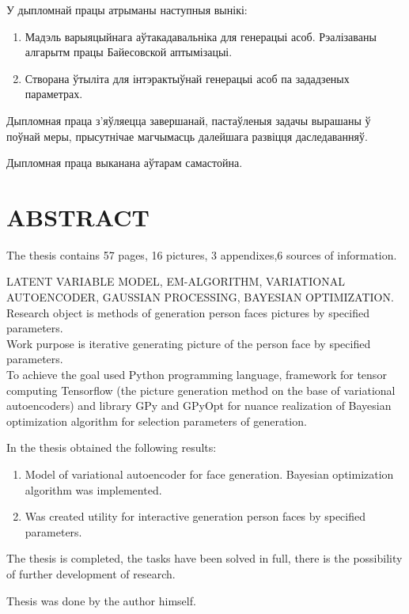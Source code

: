 \indent
У дыпломнай працы атрыманы наступныя вынікі:
\begin{enumerate}
	\setlength{\itemindent}{2em}
	\setlength\itemsep{0.1em}
	\item Мадэль варыяцыйнага аўтакадавальніка для генерацыі асоб. Рэалізаваны алгарытм працы Байесовской аптымізацыі.
	\item Створана ўтыліта для інтэрактыўнай генерацыі асоб па зададзеных параметрах.
\end{enumerate}

Дыпломная праца з'яўляецца завершанай, пастаўленыя задачы вырашаны ў поўнай меры, прысутнічае магчымасць далейшага развіцця даследаванняў.

Дыпломная праца выканана аўтарам самастойна.

\newpage
\chapter*{\large ABSTRACT} 
The thesis contains 57 pages, 16 pictures, 3 appendixes,6 sources of information.

\indent
LATENT VARIABLE MODEL, EM-ALGORITHM, VARIATIONAL \\ AUTOENCODER, GAUSSIAN PROCESSING, BAYESIAN OPTIMIZATION. \\
\indent
Research object is methods of generation person faces pictures by specified parameters. \\
\indent
Work purpose is iterative generating picture of the person face by specified parameters. \\
\indent
To achieve the goal used Python programming language, framework for tensor computing Tensorflow (the picture generation method on the base of variational autoencoders) and library GPy and GPyOpt for nuance realization of Bayesian optimization algorithm for selection parameters of generation.

\indent
In the thesis obtained the following results:
\begin{enumerate}
	\setlength{\itemindent}{2em}
	\setlength\itemsep{0.1em}
	\item Model of variational autoencoder for face generation. Bayesian optimization algorithm was implemented.
	\item Was created utility for interactive  generation person faces by specified \\ parameters.  
\end{enumerate}

The thesis is completed, the tasks have been solved in full, there is the possibility of further development of research.

Thesis was done by the author himself.

\newpage
